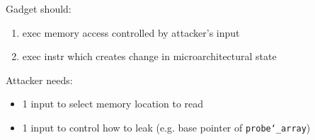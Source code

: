 Gadget should:\vspace{-1.5mm}
\begin{enumerate}
    \item exec memory access controlled by attacker's input
    \item exec instr which creates change in microarchitectural state
\end{enumerate}

Attacker needs:\vspace{-1.5mm}
\begin{itemize}
    \item 1 input to select memory location to read
    \item 1 input to control how to leak (e.g. base pointer of \texttt{probe\char`_array})
\end{itemize}
